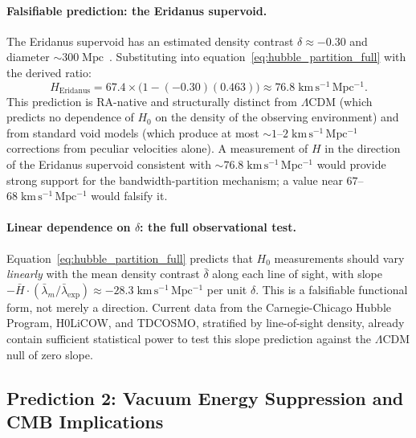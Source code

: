\documentclass[11pt,a4paper]{article}
\theoremstyle{plain}
\theoremstyle{definition}
\theoremstyle{remark}
\begin{document}
\paragraph{Falsifiable prediction: the Eridanus supervoid.}
The Eridanus supervoid has an estimated density contrast $\delta \approx -0.30$
and diameter ${\sim}300\;\mathrm{Mpc}$~\citep{Naidoo2016}. Substituting into
equation~\eqref{eq:hubble_partition_full} with the derived ratio:
\begin{equation}
  H_{\mathrm{Eridanus}}
  = 67.4 \times \bigl(1 - (-0.30)(0.463)\bigr)
  \approx 76.8\;\mathrm{km\,s^{-1}\,Mpc^{-1}}.
  \label{eq:eridanus_prediction}
\end{equation}
This prediction is RA-native and structurally distinct from $\Lambda$CDM (which
predicts no dependence of $H_0$ on the density of the observing environment) and
from standard void models (which produce at most ${\sim}1$--$2\;\mathrm{km\,s^{-1}\,Mpc^{-1}}$
corrections from peculiar velocities alone). A measurement of $H$ in the
direction of the Eridanus supervoid consistent with ${\sim}76.8\;\mathrm{km\,s^{-1}\,Mpc^{-1}}$
would provide strong support for the bandwidth-partition mechanism; a value
near $67$--$68\;\mathrm{km\,s^{-1}\,Mpc^{-1}}$ would falsify it.

\paragraph{Linear dependence on $\delta$: the full observational test.}
Equation~\eqref{eq:hubble_partition_full} predicts that $H_0$ measurements
should vary \emph{linearly} with the mean density contrast $\bar\delta$ along
each line of sight, with slope $-\bar H \cdot (\bar\lambda_m/\bar\lambda_{\mathrm{exp}})
\approx -28.3\;\mathrm{km\,s^{-1}\,Mpc^{-1}}$ per unit $\delta$. This is a
falsifiable functional form, not merely a direction. Current data from the
Carnegie-Chicago Hubble Program, H0LiCOW, and TDCOSMO, stratified by
line-of-sight density, already contain sufficient statistical power to test
this slope prediction against the $\Lambda$CDM null of zero slope.

\subsection{Prediction 2: Vacuum Energy Suppression and CMB Implications}
\end{document}
